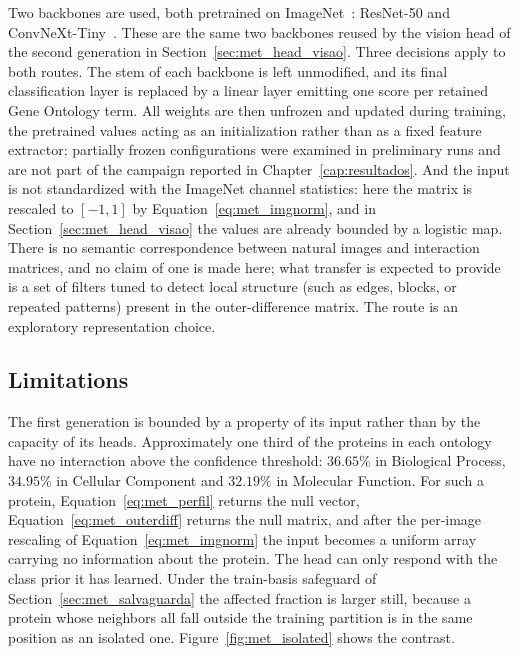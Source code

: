 \documentclass[Ingles]{ic-tese-v3}
\begin{document}
Two backbones are used, both pretrained on ImageNet~\cite{russakovsky2015imagenet}: ResNet-50
\cite{he2016deep} and ConvNeXt-Tiny~\cite{liu2022convnet}. These are the same two backbones reused
by the vision head of the second generation in Section~\ref{sec:met_head_visao}. Three decisions
apply to both routes. The stem of each backbone is left unmodified, and its final classification
layer is replaced by a linear layer emitting one score per retained Gene Ontology term. All weights
are then unfrozen and updated during training, the pretrained values acting as an initialization
rather than as a fixed feature extractor; partially frozen configurations were examined in
preliminary runs and are not part of the campaign reported in Chapter~\ref{cap:resultados}. And the
input is not standardized with the ImageNet channel statistics: here the matrix is rescaled to
$[-1,1]$ by Equation~\eqref{eq:met_imgnorm}, and in
Section~\ref{sec:met_head_visao} the values are already bounded by a logistic map. There is no
semantic correspondence between natural images and interaction matrices, and no claim of one is made
here; what transfer is expected to provide is a set of filters tuned to detect local structure (such
as edges, blocks, or repeated patterns) present in the outer-difference matrix. The route is an
exploratory representation choice.

\subsection{Limitations}
\label{sec:met_gen1_diag}

The first generation is bounded by a property of its input rather than by the capacity of its heads.
Approximately one third of the proteins in each ontology have no interaction above the confidence
threshold: $36.65\%$ in Biological Process, $34.95\%$ in Cellular Component and $32.19\%$ in
Molecular Function. For such a protein, Equation~\eqref{eq:met_perfil} returns the null vector,
Equation~\eqref{eq:met_outerdiff} returns the null matrix, and after the per-image rescaling of
Equation~\eqref{eq:met_imgnorm} the input becomes a uniform array carrying no information about the
protein. The head can only respond with the class prior it has learned. Under the train-basis
safeguard of Section~\ref{sec:met_salvaguarda} the affected fraction is larger still, because a
protein whose neighbors all fall outside the training partition is in the same position as an
isolated one. Figure~\ref{fig:met_isolated} shows the contrast.
\end{document}

